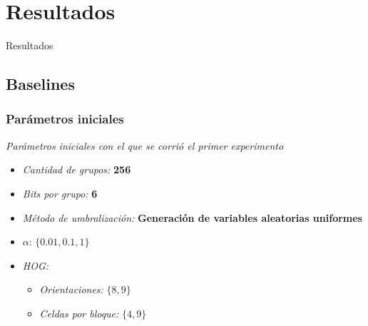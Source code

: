 \section{Resultados}
	\begin{frame}
		\begin{center}
			\begin{huge}
				{Resultados}
			\end{huge}
		\end{center}
	\end{frame}
	\subsection{Baselines}
		\begin{frame}
				\frametitle{Parámetros iniciales}
				\textit{Parámetros iniciales con el que se corrió el primer experimento}
				\begin{itemize}
					\item<1-> \textit{Cantidad de grupos:} \textbf{256}
					\item<2-> \textit{Bits por grupo:} \textbf{6}
					\item<3-> \textit{Método de umbralización:} \textbf{Generación de variables aleatorias uniformes}
					\item<4-> $\alpha$: $\{0.01, 0.1, 1\}$
					\item<5-> \textit{HOG:}
						\begin{itemize}
							\item<6-> \textit{Orientaciones:} $\{8, 9\}$
							\item<7-> \textit{Celdas por bloque:} $\{4, 9\}$
						\end{itemize}
				\end{itemize}
		\end{frame}
